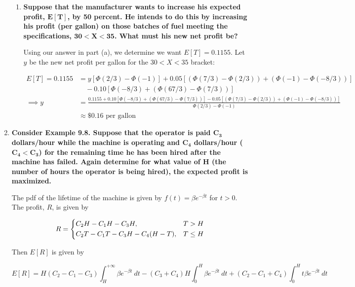 \documentclass[10pt, oneside]{article}   	%
\theoremstyle{definition}
\begin{document}
\begin{enumerate}[label=9.\arabic*]
\begin{enumerate}
	\item  \begin{tcolorbox}[
	  colback=Cerulean!5!white,
	  colframe=Cerulean!75!black]
	\textbf{Suppose that the manufacturer wants to increase his expected profit, $\bm{E[T]}$, by 50 percent. He intends to do this by increasing his profit (per gallon) on those batches of fuel meeting the specifications, $\bm{30 < X < 35}$. What must his new net profit be?}
	\end{tcolorbox}
	
	Using our answer in part (a), we determine we want $E[T] = 0.1155$. Let $y$ be the new net profit per gallon for the $30 < X < 35$ bracket:
	
	\begin{align*}
	E[T] = 0.1155 &= y [\Phi(2/3) - \Phi(-1)] + 0.05 [(\Phi(7/3) - \Phi(2/3)) + (\Phi(-1) - \Phi(-8/3))] \\
	&\quad -0.10[\Phi(-8/3) + (\Phi(67/3) - \Phi(7/3))] \\
	\implies y &= \frac{0.1155 + 0.10[\Phi(-8/3) + (\Phi(67/3) - \Phi(7/3))] - 0.05 [(\Phi(7/3) - \Phi(2/3)) + (\Phi(-1) - \Phi(-8/3))]}{\Phi(2/3) - \Phi(-1)} \\
	&\approx \boxed{\$ 0.16 \text{ per gallon}}
	\end{align*}
	\end{enumerate}

\item  \begin{tcolorbox}[
  colback=Cerulean!5!white,
  colframe=Cerulean!75!black]
\textbf{Consider Example 9.8. Suppose that the operator is paid $\bm{C_3}$ dollars/hour while the machine is operating and $\bm{C_4}$ dollars/hour ($\bm{C_4 < C_3}$) for the remaining time he has been hired after the machine has failed. Again determine for what value of $\bm{H}$ (the number of hours the operator is being hired), the expected profit is maximized.}
\end{tcolorbox}

The pdf of the lifetime of the machine is given by $f(t) = \beta e^{-\beta t}$ for $t > 0$. The profit, $R$, is given by

\[
R = \begin{dcases}
C_2 H - C_1 H - C_3 H, & T > H \\
C_2 T - C_1 T - C_3 H - C_4 (H - T), & T \leq H
\end{dcases}
\]

Then $E[R]$ is given by

\[ E[R] = H(C_2 - C_1 - C_3) \int^{+\infty}_H \beta e^{-\beta t} \ dt - (C_3 + C_4) H \int^H_0 \beta e^{-\beta t} \ dt + (C_2 - C_1 + C_4) \int^H_0 t \beta e^{-\beta t} \ dt \]


\end{enumerate}
\end{document}
